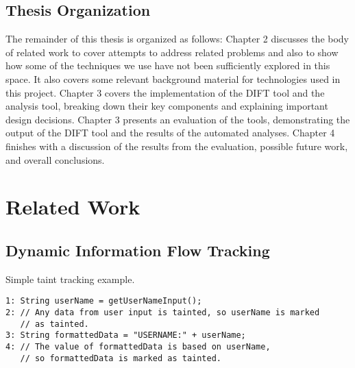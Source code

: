 \documentclass[msc,oneside]{ubcthesis}
\begin{document}
\section{Thesis Organization}
	
The remainder of this thesis is organized as follows: Chapter 2 discusses the body of related work to cover attempts to address related problems and also to show how some of the techniques we use have not been sufficiently explored in this space. It also covers some relevant background material for technologies used in this project. Chapter 3 covers the implementation of the DIFT tool and the analysis tool, breaking down their key components and explaining important design decisions. Chapter 3 presents an evaluation of the tools, demonstrating the output of the DIFT tool and the results of the automated analyses. Chapter 4 finishes with a discussion of the results from the evaluation, possible future work, and overall conclusions.
	
\chapter{Related Work}
\label{sec:relwork}

\section{Dynamic Information Flow Tracking}
	
\begin{Program}
  \caption{\label{prog:code1} Simple taint tracking example.}
\begin{verbatim}
1: String userName = getUserNameInput(); 
2: // Any data from user input is tainted, so userName is marked 
   // as tainted.
3: String formattedData = "USERNAME:" + userName; 
4: // The value of formattedData is based on userName, 
   // so formattedData is marked as tainted.
\end{verbatim}
\end{Program}	
	
\end{document}
